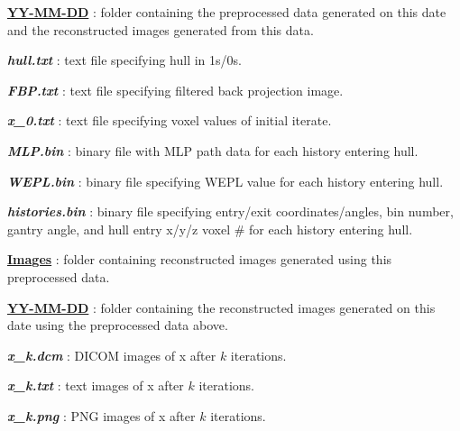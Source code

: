 \documentclass[landscape]{article}
\begin{document}
\begin{myEnumerate}[labelindent=0pt, leftmargin=*]
\begin{myEnumerate}[labelindent=1pt, leftmargin=*]
\begin{myEnumerate}[labelindent=1pt, leftmargin=*]
\begin{myEnumerate}[labelindent=1pt, leftmargin=*]
\begin{myEnumerate}[labelindent=1pt, leftmargin=*]
\begin{myEnumerate}[labelindent=1pt, leftmargin=*]
\begin{myEnumerate}[labelindent=1pt, leftmargin=*]
\begin{myEnumerate}[labelindent=1pt, leftmargin=*]
                                \item \ul{\textbf{YY-MM-DD}} : folder containing the preprocessed data generated on this date and the reconstructed images generated from this data.
                                \begin{myEnumerate}[labelindent=1pt, leftmargin=*]
                                    \item \textbf{\textit{hull.txt}} : text file specifying hull in 1s/0s.
                                    \item \textbf{\textit{FBP.txt}} : text file specifying filtered back projection image.
                                    \item \textbf{\textit{x\_0.txt}} : text file specifying voxel values of initial iterate.
                                    \item \textbf{\textit{MLP.bin}} : binary file with MLP path data for each history entering hull.
                                    \item \textbf{\textit{WEPL.bin}} : binary file specifying WEPL value for each history entering hull.
                                    \item \textbf{\textit{histories.bin}} : binary file specifying entry/exit coordinates/angles, bin number, gantry angle, and hull entry x/y/z voxel \# for each history entering hull.
                                    \item \ul{\textbf{Images}} : folder containing reconstructed images generated using this preprocessed data.
                                    \begin{myEnumerate}[labelindent=1pt, leftmargin=*]
                                        \item \ul{\textbf{YY-MM-DD}} : folder containing the reconstructed images generated on this date using the preprocessed data above.
                                            \begin{myEnumerate}[labelindent=1pt, leftmargin=*]
                                                \item \textbf{\textit{x\_k.dcm}} : DICOM images of x after $k$ iterations.
                                                \item \textbf{\textit{x\_k.txt}} : text images of x after $k$ iterations.
                                                \item \textbf{\textit{x\_k.png}} : PNG images of x after $k$ iterations.
                                            \end{myEnumerate}

\end{myEnumerate}
\end{myEnumerate}
\end{myEnumerate}
\end{myEnumerate}
\end{myEnumerate}
\end{myEnumerate}
\end{myEnumerate}
\end{myEnumerate}
\end{myEnumerate}
\end{myEnumerate}
\end{document}
